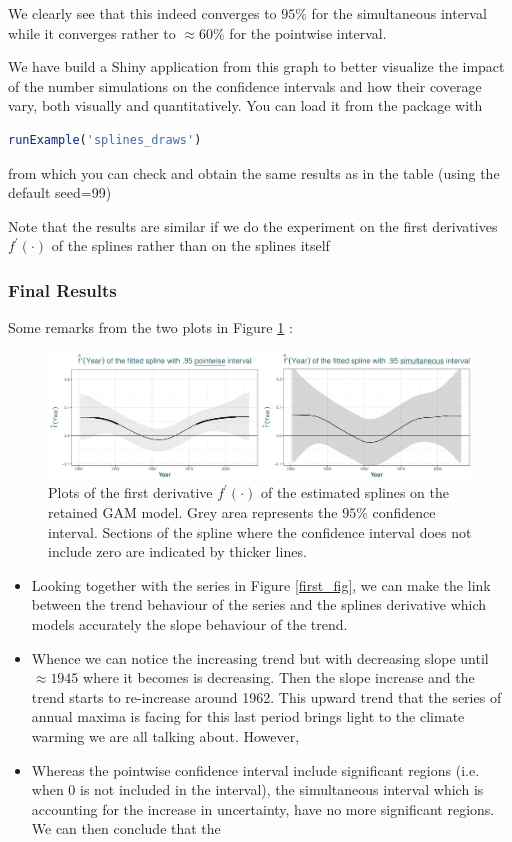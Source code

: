 We clearly see that this indeed converges to $95\%$ for the simultaneous interval while it converges rather to $\approx 60\%$ for the pointwise interval.

We have build a Shiny application from this graph to better visualize the impact of the number simulations on the confidence intervals and how their coverage vary, both visually and quantitatively. You can load it from the package with \begin{lstlisting}[language=R]
runExample('splines_draws')\end{lstlisting} from which you can check and obtain the same results as in the table (using the default seed=99)

Note that the results are similar if we do the experiment on the first derivatives $f^{'}(\cdot)$ of the splines rather than on the splines itself


\subsubsection*{Final Results}


Some remarks from the two plots in Figure \ref{fig:derivsplines} :

\begin{figure}[!htb]
	\includegraphics[width=.99\linewidth]{splines.pdf}\caption{Plots of the first derivative $f^{'}(\cdot)$ of the estimated splines on the retained GAM model. Grey area represents the $95\%$ confidence interval. Sections of the spline where the confidence interval does not include zero are indicated by thicker lines. }\label{fig:derivsplines}
\end{figure}

\begin{itemize}
\item Looking together with the series in Figure \ref{first_fig}, we can make the link between the trend behaviour of the series and the splines derivative which models accurately the slope behaviour of the trend. 
\item Whence we can notice the increasing trend but with decreasing slope until $\approx 1945$ where it becomes is decreasing. Then the slope increase and the trend starts to re-increase around 1962. This upward trend that the series of annual maxima is facing for this last period brings light to the climate warming we are all talking about. However, 
\item  Whereas the pointwise confidence interval include significant regions (i.e. when 0 is not included in the interval), the simultaneous interval which is accounting for the increase in uncertainty, have no more significant regions. We can then conclude that the 

\end{itemize}


